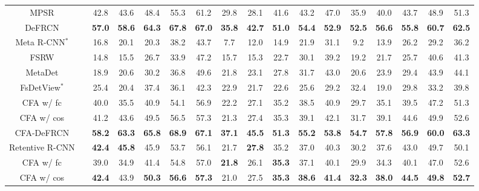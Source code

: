 \documentclass[10pt,twocolumn,letterpaper]{article}
\newcommand{\cmark}{\ding{51}}\newcommand{\xmark}{\ding{55}}\newcommand\minisection[1]{\vspace{1mm}\noindent \textbf{#1}}
\newcommand{\best}[1]{\color{red}\textbf{#1}}
\newcommand{\second}[1]{\color{blue}\textbf{#1}}
\begin{document}
\begin{table*}
\begin{tabular}{c| c | c c c c c | c c c c c | c c c c c}
      MPSR\cite{MPSR}& \xmark & 42.8 & 43.6 & 48.4 & 55.3 & 61.2 & 29.8 & 28.1 & 41.6 & 43.2 & 47.0 & 35.9 & 40.0 & 43.7 & 48.9 & 51.3 \\
      DeFRCN\cite{defrcn}& \xmark & \second{57.0} & \second{58.6} & \second{64.3} & \second{67.8} & \second{67.0} &
     \second{35.8} & \second{42.7} & \second{51.0} & \second{54.4} & \second{52.9} & \second{52.5} & \second{56.6} & \second{55.8} & \best{60.7} & \second{62.5} \\ \Xhline{1pt}
      Meta R-CNN$^{*}$\cite{MetaRCNN}& \xmark & 16.8 & 20.1 & 20.3 & 38.2 & 43.7 & 7.7 & 12.0 & 14.9 & 21.9 & 31.1 & 9.2 & 13.9 & 26.2 & 29.2 & 36.2 \\
      FSRW\cite{FSRW}& \xmark & 14.8 & 15.5 & 26.7 & 33.9 & 47.2 & 15.7 & 15.3 & 22.7 & 30.1 & 39.2 & 19.2 & 21.7 & 25.7 & 40.6 & 41.3 \\
      MetaDet\cite{MetaDet}& \xmark & 18.9 & 20.6 & 30.2 & 36.8 & 49.6 & 21.8 & 23.1 & 27.8 & 31.7 & 43.0 & 20.6 & 23.9 & 29.4 & 43.9 & 44.1\\
      FsDetView$^*$\cite{FsDetView}& \xmark & 25.4 & 20.4 & 37.4 & 36.1 & 42.3 & 22.9 & 21.7 & 22.6 & 25.6 & 29.2 & 32.4 & 19.0 & 29.8 & 33.2 & 39.8 \\ \Xhline{1pt}
      \rowcolor[HTML]{EFEFEF}
      CFA w/ fc& \xmark & 40.0 & 35.5 & 40.9 & 54.1 & 56.9 & 22.2 & 27.1 & 35.2 & 38.5 & 40.9 & 29.7 & 35.1 & 39.5 & 47.2 & 51.3 \\
      \rowcolor[HTML]{EFEFEF}
      CFA w/ cos& \xmark & 41.2 & 43.6 & 49.5 & 56.5 & 57.3 & 21.3 & 27.4 & 35.3 & 39.1 & 42.1 & 31.7 & 39.1 & 44.6 & 49.9 & 52.6 \\
      \rowcolor[HTML]{EFEFEF}
    CFA-DeFRCN& \xmark & \best{58.2} & \best{63.3} & \best{65.8} & \best{68.9} & \best{67.1} & \best{37.1} & \best{45.5} & \best{51.3} & \best{55.2} & \best{53.8} & \best{54.7} & \best{57.8} & \best{56.9} & \second{60.0} & \best{63.3} \\
      \midrule[1.5pt]
      Retentive R-CNN\cite{gfsod}& \cmark& \second{42.4} & \second{45.8} & 45.9 & 53.7 & 56.1 & 21.7 & \second{27.8} & 35.2 & 37.0 & 40.3 & 30.2 & 37.6 & 43.0 & 49.7 & 50.1 \\
      \Xhline{1pt}
      \rowcolor[HTML]{EFEFEF}
      CFA w/ fc& \cmark & 39.0 & 34.9 & 41.4 & 54.8 & 57.0 & \second{21.8} & 26.1 & \second{35.3} & 37.1 & 40.1 & 29.9 & 34.3 & 40.1 & 47.0 & 52.6 \\
      \rowcolor[HTML]{EFEFEF}
      CFA w/ cos& \cmark &  \second{42.4} & 43.9 & \second{50.3} & \second{56.6} & \second{57.3} & 21.0 & 27.5 & \second{35.3} & \second{38.6} & \second{41.4} &  \second{32.3} & \second{38.0} & \second{44.5} & \second{49.8} & \second{52.7} \\

\end{tabular}
\end{table*}
\end{document}
